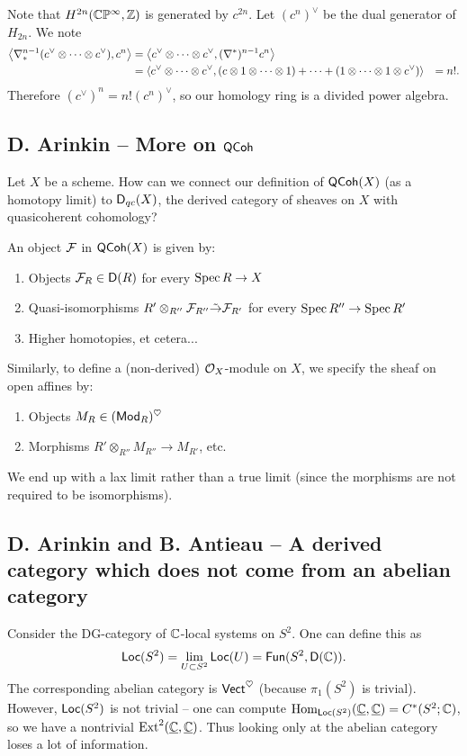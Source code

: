 \documentclass{amsart}
\begin{document}
Note that $H^{2n}(\mathbb{C}\mathbb{P}^\infty, \mathbb{Z})$ is generated by $c^{2n}$.
Let $(c^n)^\vee$ be the dual generator of $H_{2n}$.
We note
\begin{align*}
	\left\langle \nabla_*^{n-1} (c^\vee \otimes \dots \otimes c^\vee), c^n \right\rangle &= 
	\left\langle c^\vee \otimes \dots \otimes c^\vee, (\nabla^*)^{n-1}c^n \right\rangle \\
	&= \left\langle c^\vee \otimes \dots \otimes c^\vee, (c \otimes 1 \otimes \dots \otimes 1) + \dots + (1 \otimes \dots \otimes 1 \otimes c^\vee) \right\rangle
	&= n!.
\end{align*}
Therefore $(c^\vee)^n = n! (c^n)^\vee$, so our homology ring is a divided power algebra.

\subsection{D. Arinkin -- More on $\mathsf{QCoh}$}

Let $X$ be a scheme.
How can we connect our definition of $\mathsf{QCoh}(X)$ (as a homotopy limit) to $\mathsf{D}_{qc}(X)$, the derived category of sheaves on $X$ with quasicoherent cohomology?

An object $\mathcal{F}$ in $\mathsf{QCoh}(X)$ is given by:
\begin{enumerate}
	\item Objects $\mathcal{F}_R \in \mathsf{D}(R)$ for every $\operatorname{Spec} R \to X$
	\item Quasi-isomorphisms $R' \otimes_{R''} \mathcal{F}_{R''} \tilde{\to} \mathcal{F}_{R'}$ for every $\operatorname{Spec} R'' \to \operatorname{Spec} R'$
	\item Higher homotopies, et cetera...
\end{enumerate}

Similarly, to define a (non-derived) $\mathcal{O}_X$-module on $X$, we specify the sheaf on open affines by:
\begin{enumerate}
	\item Objects $M_R \in (\mathsf{Mod}_R)^\heartsuit$
	\item Morphisms $R' \otimes_{R''} M_{R''} \to M_{R'}$, etc.
\end{enumerate}
We end up with a lax limit rather than a true limit (since the morphisms are not required to be isomorphisms).

\subsection{D. Arinkin and B. Antieau -- A derived category which does not come from an abelian category}

Consider the DG-category of $\mathbb{C}$-local systems on $S^2$.
One can define this as
\[
	\mathsf{Loc}(S^2) = \lim_{U \subset S^2} \mathsf{Loc}(U) = \mathsf{Fun}(S^2, \mathsf{D}(\mathbb{C})).
\]
The corresponding abelian category is $\mathsf{Vect}^\heartsuit$ (because $\pi_1(S^2)$ is trivial).
However, $\mathsf{Loc}(S^2)$ is not trivial -- one can compute $\operatorname{Hom}_{\mathsf{Loc}(S^2)}(\underline{\mathbb{C}}, \underline{\mathbb{C}}) = C^*(S^2; \mathbb{C})$, so we have a nontrivial $\operatorname{Ext}^2(\underline{\mathbb{C}}, \underline{\mathbb{C}})$.
Thus looking only at the abelian category loses a lot of information.
\end{document}
